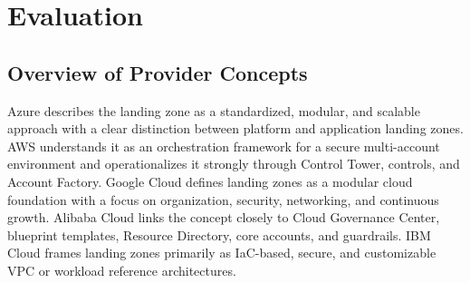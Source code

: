 \section{Evaluation}
\label{sec:evaluation}




\subsection{Overview of Provider Concepts}

Azure describes the landing zone as a standardized, modular, and scalable approach with a clear distinction between platform and application landing zones. AWS understands it as an orchestration framework for a secure multi-account environment and operationalizes it strongly through Control Tower, controls, and Account Factory. Google Cloud defines landing zones as a modular cloud foundation with a focus on organization, security, networking, and continuous growth. Alibaba Cloud links the concept closely to Cloud Governance Center, blueprint templates, Resource Directory, core accounts, and guardrails. IBM Cloud frames landing zones primarily as IaC-based, secure, and customizable VPC or workload reference architectures.

